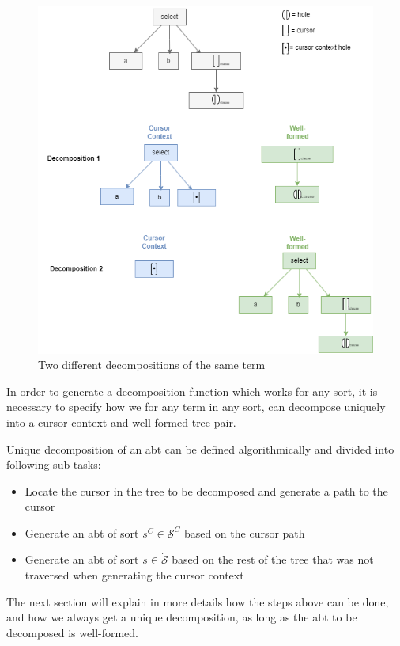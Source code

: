 \begin{figure}[H]
  \centering
  \includegraphics[width=\textwidth]{img/slq-decompose-ex.drawio.png}
  \caption{Two different decompositions of the same term}
  \label{fig:sql-decomp-ex}
\end{figure}

In order to generate a decomposition function which works for any sort,
it is necessary to specify how we for any term in any sort,
can decompose uniquely into a cursor context and well-formed-tree pair.

Unique decomposition of an abt can be defined algorithmically and divided
into following sub-tasks:
\begin{itemize}
  \item Locate the cursor in the tree to be decomposed and generate a path to the cursor
  \item Generate an abt of sort $s^C \in \mathcal{S}^C$ based on the cursor path
  \item Generate an abt of sort $\dot{s} \in \dot{\mathcal{S}}$
        based on the rest of the tree that was not traversed
        when generating the cursor context
\end{itemize}

The next section will explain in more details how the steps above can be done,
and how we always get a unique decomposition, as long as the abt to be decomposed is well-formed.


